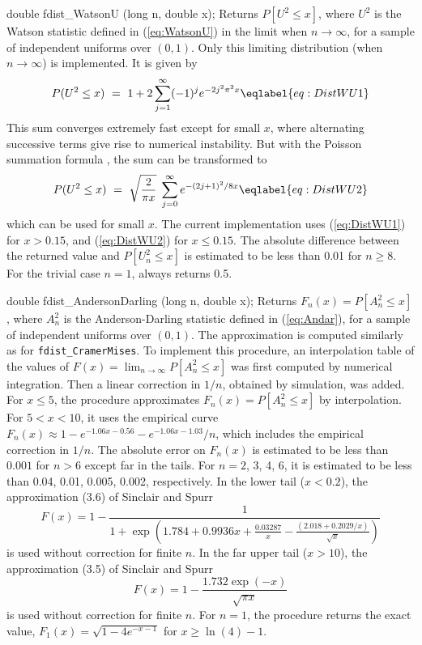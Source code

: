 double fdist_WatsonU (long n, double x);
\endcode
 \tab  Returns $P[U^2 \le x]$, where $U^2$ is the Watson statistic 
  defined in (\ref{eq:WatsonU}) in the limit when $n \to\infty$,
  for a sample of independent uniforms over $(0,1)$.
  Only this limiting distribution (when $n \to\infty$) is implemented. 
  It is given by
   \begin{equation}
    P(U^2 \le x)  \ = \ 1 + 2 \sum_{j=1}^\infty (-1)^j e^{-2 j^2 \pi^2 x}
                                                      \eqlabel{eq:DistWU1}
   \end{equation}
  This sum converges extremely fast except for small $x$, where alternating
  successive terms give rise to numerical instability.
  But with the Poisson summation formula \cite{mLAN73a},
  the sum can be transformed to
  \begin{equation}
     P(U^2 \le x)  \ = \  \sqrt{\frac2{\pi x}}\; \sum_{j=0}^\infty
        e^{- (2 j+1)^2/8 x}                           \eqlabel{eq:DistWU2}
  \end{equation}
  which can be used for small $x$.
  The current implementation uses (\ref{eq:DistWU1}) for $x > 0.15$,
  and (\ref{eq:DistWU2}) for $x \le 0.15$.
  The absolute difference between the returned value and $P[U_n^2 \le x]$ 
  is estimated to be less than 0.01 for $n \ge 8$. 
  For the trivial case $n=1$, always returns 0.5.
 \endtab
\code


double fdist_AndersonDarling (long n, double x);
\endcode
 \tab Returns $F_n(x) = P[A_n^2 \le x]$, where $A_n^2$ is the
  Anderson-Darling statistic \cite{tAND52a} defined in (\ref{eq:Andar}),
  for a sample of independent uniforms over $(0,1)$.
  The approximation is computed similarly as for 
  {\tt fdist\_CramerMises}.
  To implement this procedure, an interpolation table of the values of
  $F(x) = \lim_{n\to\infty} P[A_n^2 \le x]$
  was first computed by numerical integration. 
  Then a linear correction in $1/n$, obtained by simulation, was added.
  For $x \le 5$, the procedure approximates $F_n(x) = P[A_n^2 \le x]$ by
  interpolation.  For $5 < x < 10$, it uses the empirical curve
  $F_n(x) \approx 1 - e^{-1.06x - 0.56} - e^{-1.06x - 1.03}/n$,
  which includes the empirical  correction in $1/n$.
  The absolute error on $F_n(x)$ is estimated to be
  less than $0.001$ for $n > 6$ except far in the tails.
  For $n = 2$, 3, 4, 6, it is estimated to be
  less than  0.04, 0.01, 0.005, 0.002, respectively.
  In the lower tail ($x < 0.2$), the approximation (3.6) of Sinclair
   and Spurr \cite{tSIN88a}
$$
  F(x) = 1 - \frac1{1 + \exp{\left(1.784 + 0.9936x +
 \frac{0.03287}{x}
    - \frac{(2.018 + {0.2029}/{x})}{\sqrt x}\right)}}
$$
  is used without correction for finite $n$. In the far upper tail
  ($x > 10$), the approximation (3.5) of Sinclair
   and Spurr \cite{tSIN88a}
$$
      F(x) =  1 - \frac{1.732  \exp(-x)}{\sqrt{\pi x}}
$$
 is used without correction for finite $n$.
  For $n=1$, the procedure returns the exact value,
  $F_1(x) = \sqrt{1 - 4e^{-x-1}}$ for $x\ge \ln(4) - 1$.
 \endtab
\code


